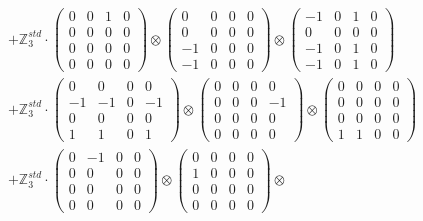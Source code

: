 \documentclass{article}
\begin{document}
{\begin{align}
        &+ \label{Rs16-Rc11-Solution-23-c22} \mathbb{Z}_3^{std} \cdot 
            \begin{pmatrix} 0 & 0 & 1 & 0 \\ 0 & 0 & 0 & 0 \\ 0 & 0 & 0 & 0 \\ 0 & 0 & 0 & 0 \end{pmatrix} \otimes 
            \begin{pmatrix} 0 & 0 & 0 & 0 \\ 0 & 0 & 0 & 0 \\ -1 & 0 & 0 & 0 \\ -1 & 0 & 0 & 0 \end{pmatrix} \otimes 
            \begin{pmatrix} -1 & 0 & 1 & 0 \\ 0 & 0 & 0 & 0 \\ -1 & 0 & 1 & 0 \\ -1 & 0 & 1 & 0 \end{pmatrix} \\ 
        &+ \label{Rs16-Rc11-Solution-23-c23} \mathbb{Z}_3^{std} \cdot 
            \begin{pmatrix} 0 & 0 & 0 & 0 \\ -1 & -1 & 0 & -1 \\ 0 & 0 & 0 & 0 \\ 1 & 1 & 0 & 1 \end{pmatrix} \otimes 
            \begin{pmatrix} 0 & 0 & 0 & 0 \\ 0 & 0 & 0 & -1 \\ 0 & 0 & 0 & 0 \\ 0 & 0 & 0 & 0 \end{pmatrix} \otimes 
            \begin{pmatrix} 0 & 0 & 0 & 0 \\ 0 & 0 & 0 & 0 \\ 0 & 0 & 0 & 0 \\ 1 & 1 & 0 & 0 \end{pmatrix} \\ 
        &+ \label{Rs16-Rc11-Solution-23-c24} \mathbb{Z}_3^{std} \cdot 
            \begin{pmatrix} 0 & -1 & 0 & 0 \\ 0 & 0 & 0 & 0 \\ 0 & 0 & 0 & 0 \\ 0 & 0 & 0 & 0 \end{pmatrix} \otimes 
            \begin{pmatrix} 0 & 0 & 0 & 0 \\ 1 & 0 & 0 & 0 \\ 0 & 0 & 0 & 0 \\ 0 & 0 & 0 & 0 \end{pmatrix} \otimes 

\end{align}}
\end{document}
